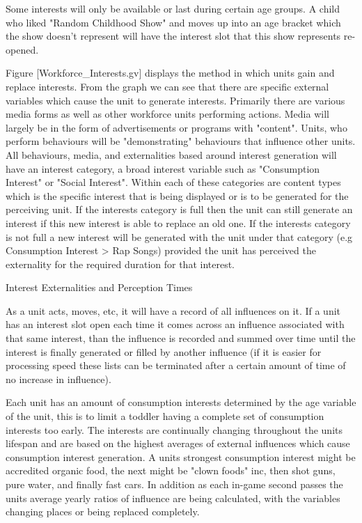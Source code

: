 Some interests will only be available or last during certain age groups. A child who liked "Random Childhood Show" and moves up into an age bracket which the show doesn't represent will have the interest slot that this show represents re-opened. 

Figure [Workforce_Interests.gv] displays the method in which units gain and replace interests. From the graph we can see that there are specific external variables which cause the unit to generate interests. Primarily there are various media forms as well as other workforce units performing actions. Media will largely be in the form of advertisements or programs with "content". Units, who perform behaviours will be "demonstrating" behaviours that influence other units. All behaviours, media, and externalities based around interest generation will have an interest category, a broad interest variable such as "Consumption Interest" or "Social Interest". Within each of these categories are content types which is the specific interest that is being displayed or is to be generated for the perceiving unit. If the interests category is full then the unit can still generate an interest if this new interest is able to replace an old one. If the interests category is not full a new interest will be generated with the unit under that category (e.g Consumption Interest > Rap Songs) provided the unit has perceived the externality for the required duration for that interest.

Interest Externalities and Perception Times



As a unit acts, moves, etc, it will have a record of all influences on it. If a unit has an interest slot open each time it comes across an influence associated with that same interest, than the influence is recorded and summed over time until the interest is finally generated or filled by another influence (if it is easier for processing speed these lists can be terminated after a certain amount of time of no increase in influence).

Each unit has an amount of consumption interests determined by the age variable of the unit, this is to limit a toddler having a complete set of consumption interests too early. The interests are continually changing throughout the units lifespan and are based on the highest averages of external influences which cause consumption interest generation. A units strongest consumption interest might be accredited organic food, the next might be "clown foods" inc, then shot guns, pure water, and finally fast cars. In addition as each in-game second passes the units average yearly ratios of influence are being calculated, with the variables changing places or being replaced completely.   
 

